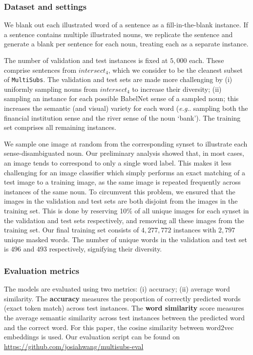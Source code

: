 \documentclass[twocolumn]{svjour3}          \smartqed  \usepackage{graphicx}
\makeatletter
\newcommand{\multisubs}{\texttt{MultiSubs}\xspace}
\DeclareRobustCommand\onedot{\futurelet\@let@token\@onedot}
\def\@onedot{\ifx\@let@token.\else.\null\fi\xspace}
\newcommand{\eg}{\emph{e.g}\onedot} \newcommand{\Eg}{\emph{E.g}\onedot}
\makeatother
\begin{document}
\subsubsection{Dataset and settings}
\label{sec:gapfilling-settings}

We blank out each illustrated word of a sentence as a fill-in-the-blank instance. If a sentence contains multiple illustrated nouns, we replicate the sentence and generate a blank per sentence for each noun, treating each as a separate instance. 

The number of validation and test instances is fixed at $5,000$ each. These comprise sentences from \textbf{$intersect_4$}, which we consider to be the cleanest subset of \multisubs. The validation and test sets are made more challenging by (i) uniformly sampling nouns from \textbf{$intersect_4$} to increase their diversity; (ii) sampling an instance for each possible BabelNet sense of a sampled noun; this increases the semantic (and visual) variety for each word (\eg sampling both the financial institution sense and the river sense of the noun `bank'). The training set comprises all remaining instances. 

We sample one image at random from the corresponding synset to illustrate each sense-disambiguated noun. Our preliminary analysis showed that, in most cases, an image tends to correspond to only a single word label. This makes it less challenging for an image classifier which simply performs an exact matching of a test image to a training image, as the same image is repeated frequently across instances of the same noun. To circumvent this problem, we ensured that the images in the validation and test sets are both disjoint from the images in the training set. This is done by reserving 10\% of all unique images for each synset in the validation and test sets respectively, and removing all these images from the training set. Our final training set consists of $4,277,772$ instances with $2,797$ unique masked words. The number of unique words in the validation and test set is $496$ and $493$ respectively, signifying their diversity.



\subsubsection{Evaluation metrics}
\label{sec:gapfilling-metrics}

The models are evaluated using two metrics: (i) accuracy; (ii) average word similarity. The \textbf{accuracy} measures the proportion of correctly predicted words (exact token match) across test instances. The \textbf{word similarity} score measures the average semantic similarity across test instances between the predicted word and the correct word. For this paper, the cosine similarity between word2vec embeddings is used. Our evaluation script can be found on \url{https://github.com/josiahwang/multisubs-eval}
\end{document}
